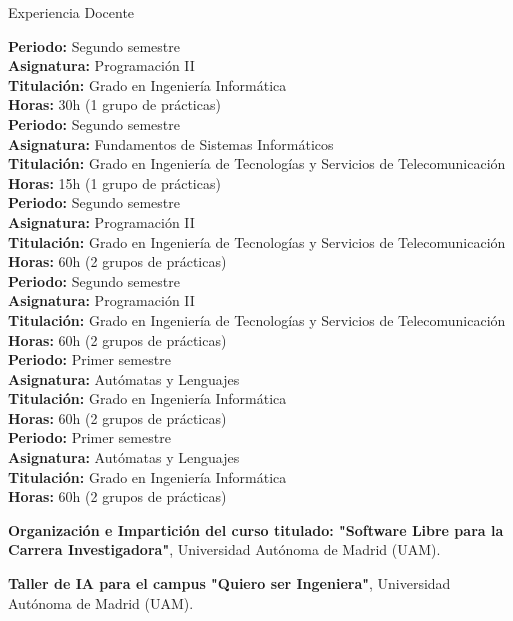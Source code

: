 \begin{rubric}{Experiencia Docente}
	
	
	\entry*[Curso: 2019-2020] 
	\textbf{Periodo:} Segundo semestre \\
	\textbf{Asignatura:} Programación II \\
	\textbf{Titulación:} Grado en Ingeniería Informática \\
	\textbf{Horas:} 30h (1 grupo de prácticas) \\[0.5em] %
	
	\entry*[Curso: 2019-2020] 
	\textbf{Periodo:} Segundo semestre \\
	\textbf{Asignatura:} Fundamentos de Sistemas Informáticos \\
	\textbf{Titulación:} Grado en Ingeniería de Tecnologías y Servicios de Telecomunicación \\
	\textbf{Horas:} 15h (1 grupo de prácticas) \\[0.5em]
	
	\entry*[Curso: 2020-2021] 
	\textbf{Periodo:} Segundo semestre \\
	\textbf{Asignatura:} Programación II \\
	\textbf{Titulación:} Grado en Ingeniería de Tecnologías y Servicios de Telecomunicación \\
	\textbf{Horas:} 60h (2 grupos de prácticas) \\[0.5em]
	
	\entry*[Curso: 2021-2022] 
	\textbf{Periodo:} Segundo semestre \\
	\textbf{Asignatura:} Programación II \\
	\textbf{Titulación:} Grado en Ingeniería de Tecnologías y Servicios de Telecomunicación \\
	\textbf{Horas:} 60h (2 grupos de prácticas) \\[0.5em]
	
	\entry*[Curso: 2022-2023] 
	\textbf{Periodo:} Primer semestre \\
	\textbf{Asignatura:} Autómatas y Lenguajes \\
	\textbf{Titulación:} Grado en Ingeniería Informática \\
	\textbf{Horas:} 60h (2 grupos de prácticas) \\[0.5em]
	
	\entry*[Curso: 2023-2024] 
	\textbf{Periodo:} Primer semestre \\
	\textbf{Asignatura:} Autómatas y Lenguajes \\
	\textbf{Titulación:} Grado en Ingeniería Informática \\
	\textbf{Horas:} 60h (2 grupos de prácticas)
	
	\entry*[4 y 11 de marzo de 2024] \textbf{Organización e Impartición del curso titulado: "Software Libre para la Carrera Investigadora"}, Universidad Autónoma de Madrid (UAM).
	
	\entry*[Junio 2024] \textbf{Taller de IA para el campus "Quiero ser Ingeniera"}, Universidad Autónoma de Madrid (UAM).
	
\end{rubric}
